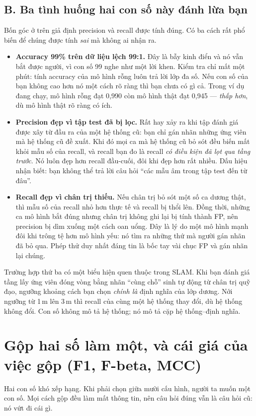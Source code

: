 \documentclass[../../deep_learning.tex]{subfiles}
\begin{document}
\subsection{B. Ba tình huống hai con số này đánh lừa bạn}
Bốn góc ở trên giả định precision và recall được tính đúng. Có ba cách rất phổ biến để chúng được tính \emph{sai} mà không ai nhận ra.

\begin{itemize}
\item \textbf{Accuracy 99\% trên dữ liệu lệch 99:1.} Đây là bẫy kinh điển và nó vẫn bắt được người, vì con số 99 nghe như một lời khen. Kiểm tra chỉ mất một phút: tính accuracy của mô hình rỗng luôn trả lời lớp đa số. Nếu con số của bạn không cao hơn nó một cách rõ ràng thì bạn chưa có gì cả. Trong ví dụ đang chạy, mô hình rỗng đạt 0{,}990 còn mô hình thật đạt 0{,}945 --- \emph{thấp hơn}, dù mô hình thật rõ ràng có ích.
\item \textbf{Precision đẹp vì tập test đã bị lọc.} Rất hay xảy ra khi tập đánh giá được xây từ đầu ra của một hệ thống cũ: bạn chỉ gán nhãn những ứng viên mà hệ thống cũ đề xuất. Khi đó mọi ca mà hệ thống cũ bỏ sót đều biến mất khỏi mẫu số của recall, và recall bạn đo là recall \emph{có điều kiện đã lọt qua tầng trước}. Nó luôn đẹp hơn recall đầu-cuối, đôi khi đẹp hơn rất nhiều. Dấu hiệu nhận biết: bạn không thể trả lời câu hỏi ``các mẫu âm trong tập test đến từ đâu''.
\item \textbf{Recall đẹp vì chân trị thiếu.} Nếu chân trị bỏ sót một số ca dương thật, thì mẫu số của recall nhỏ hơn thực tế và recall bị thổi lên. Đồng thời, những ca mô hình bắt đúng nhưng chân trị không ghi lại bị tính thành FP, nên precision bị dìm xuống một cách oan uổng. Đây là lý do một mô hình mạnh đôi khi trông tệ hơn mô hình yếu: nó tìm ra những thứ mà người gán nhãn đã bỏ qua. Phép thử duy nhất đáng tin là bốc tay vài chục FP và gán nhãn lại chúng.
\end{itemize}

Trường hợp thứ ba có một biểu hiện quen thuộc trong SLAM. Khi bạn đánh giá tầng lấy ứng viên đóng vòng bằng nhãn ``cùng chỗ'' sinh tự động từ chân trị quỹ đạo, ngưỡng khoảng cách bạn chọn \emph{chính là} định nghĩa của lớp dương. Nới ngưỡng từ 1\,m lên 3\,m thì recall của cùng một hệ thống thay đổi, dù hệ thống không đổi. Con số không mô tả hệ thống; nó mô tả cặp hệ thống--định nghĩa.

\section{Gộp hai số làm một, và cái giá của việc gộp (F1, F-beta, MCC)}
Hai con số khó xếp hạng. Khi phải chọn giữa mười cấu hình, người ta muốn một con số. Mọi cách gộp đều làm mất thông tin, nên câu hỏi đúng vẫn là câu hỏi cũ: nó vứt đi cái gì.
\end{document}
